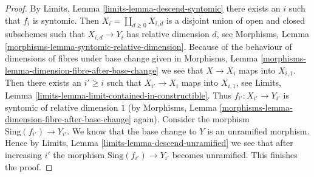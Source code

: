 \documentclass[10pt,a4paper]{amsart}
\theoremstyle{plain}
\theoremstyle{definition}
\theoremstyle{remark}
\numberwithin{equation}{subsection}
\begin{document}
\begin{proof}
By Limits, Lemma \ref{limits-lemma-descend-syntomic}
there exists an $i$ such that $f_i$ is syntomic.
Then $X_i = \coprod_{d \geq 0} X_{i, d}$ is a disjoint union of
open and closed subschemes such that $X_{i, d} \to Y_i$
has relative dimension $d$, see
Morphisms, Lemma \ref{morphisms-lemma-syntomic-relative-dimension}.
Because of the behaviour of dimensions of fibres under base change given in
Morphisms, Lemma \ref{morphisms-lemma-dimension-fibre-after-base-change}
we see that $X \to X_i$ maps into $X_{i, 1}$.
Then there exists an $i' \geq i$ such that $X_{i'} \to X_i$
maps into $X_{i, 1}$, see
Limits, Lemma \ref{limits-lemma-limit-contained-in-constructible}.
Thus $f_{i'} : X_{i'} \to Y_{i'}$ is syntomic of relative dimension $1$
(by Morphisms, Lemma \ref{morphisms-lemma-dimension-fibre-after-base-change}
again).
Consider the morphism $\text{Sing}(f_{i'}) \to Y_{i'}$.
We know that the base change to $Y$ is an unramified morphism.
Hence by Limits, Lemma \ref{limits-lemma-descend-unramified}
we see that after increasing $i'$ the morphism
$\text{Sing}(f_{i'}) \to Y_{i'}$ becomes unramified.
This finishes the proof.
\end{proof}
\end{document}
